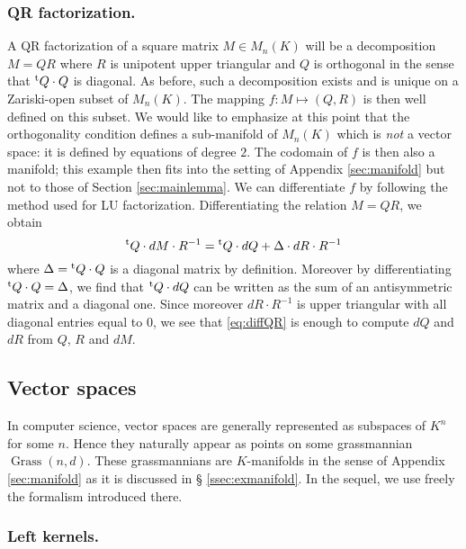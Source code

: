\documentclass{lms}
\DeclareMathOperator{\Grass}{Grass}
\begin{document}
\subsubsection*{QR factorization.}

A QR factorization of a square matrix $M \in M_n(K)$ will be
a decomposition $M = QR$ where $R$ is unipotent upper triangular and $Q$ is
orthogonal in the sense that ${}^{\text t} Q \cdot Q$ is diagonal. As before, such 
a decomposition exists and is unique on a Zariski-open subset of $M_n(K)$. The
mapping $f : M \mapsto (Q,R)$ is then well defined on this subset. We 
would like to emphasize at this point that the orthogonality condition
defines a sub-manifold of $M_n(K)$ which is \emph{not} a
vector space: it is defined by equations of degree $2$. The codomain
of $f$ is then also a manifold; this example then fits into the setting
of Appendix \ref{sec:manifold} but not to those of Section \ref{sec:mainlemma}. 
We can differentiate $f$ by following the method used for LU 
factorization.  Differentiating the relation $M = QR$, we obtain
\begin{equation}
\label{eq:diffQR}
{}^{\text t} Q \cdot dM \cdot R^{-1} = {}^{\text t} Q \cdot dQ + \Delta \cdot dR 
\cdot R^{-1}
\end{equation}
where $\Delta = {}^{\text t} Q \cdot Q$ is a diagonal matrix by definition.
Moreover by differentiating ${}^{\text t} Q \cdot Q = \Delta$, we find that
${}^{\text t} Q \cdot dQ$ can be written as the sum of an antisymmetric 
matrix and a diagonal one. Since moreover $dR \cdot R^{-1}$ is upper
triangular with all diagonal entries equal to $0$, we see that 
\eqref{eq:diffQR} is enough to compute $dQ$ and $dR$ from $Q$, $R$ 
and $dM$.

\subsection{Vector spaces}

In computer science, vector spaces are generally represented as subspaces 
of $K^n$ for some $n$. Hence they naturally appear as points on some 
grassmannian $\Grass(n,d)$. These grassmannians are $K$-manifolds in the 
sense of Appendix \ref{sec:manifold} as it is discussed in \S 
\ref{ssec:exmanifold}. In the sequel, we use freely the formalism 
introduced there.

\subsubsection*{Left kernels.}
\end{document}
